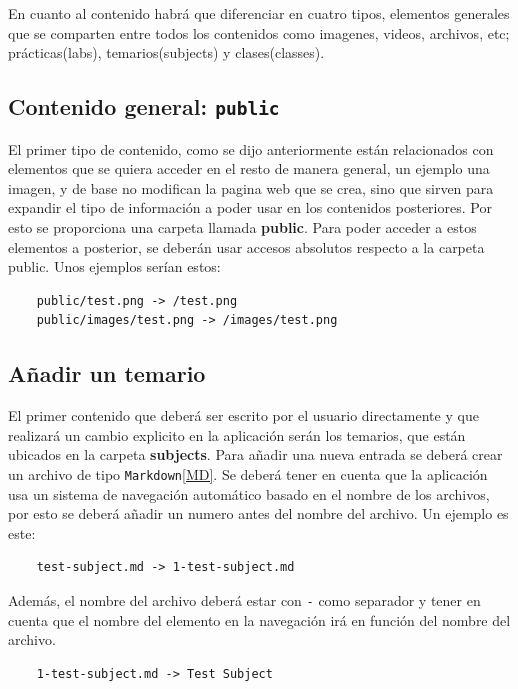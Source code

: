 En cuanto al contenido habrá que diferenciar en cuatro tipos, elementos generales que se comparten entre todos los contenidos como imagenes, videos, archivos, etc; prácticas(labs), temarios(subjects) y clases(classes).

\subsection{Contenido general: {\tt public}}

El primer tipo de contenido, como se dijo anteriormente están relacionados con elementos que se quiera acceder en el resto de manera general, un ejemplo una imagen, y de base no modifican la pagina web que se crea, sino que sirven para expandir el tipo de información a poder usar en los contenidos posteriores. Por esto se proporciona una carpeta llamada \textbf{public}. Para poder acceder a estos elementos a posterior, se deberán usar accesos absolutos respecto a la carpeta public. Unos ejemplos serían estos:

\begin{verbatim}
    public/test.png -> /test.png
    public/images/test.png -> /images/test.png
\end{verbatim}

\subsection{Añadir un temario}

El primer contenido que deberá ser escrito por el usuario directamente y que realizará un cambio explicito en la aplicación serán los temarios, que están ubicados en la carpeta \textbf{subjects}. Para añadir una nueva entrada se deberá crear un archivo de tipo \verb|Markdown|\ref{MD}. Se deberá tener en cuenta que la aplicación usa un sistema de navegación automático basado en el nombre de los archivos, por esto se deberá añadir un numero antes del nombre del archivo. Un ejemplo es este:

\begin{verbatim}
    test-subject.md -> 1-test-subject.md
\end{verbatim}

Además, el nombre del archivo deberá estar con \verb|-| como separador y tener en cuenta que el nombre del elemento en la navegación irá en función del nombre del archivo.

\begin{verbatim}
    1-test-subject.md -> Test Subject
\end{verbatim}


